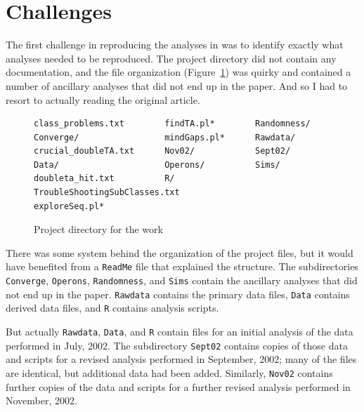 \section{Challenges}

The first challenge in reproducing the analyses
in \citet{lamichhane2003} was to identify exactly what analyses needed
to be reproduced. The project directory did not contain any
documentation, and the file organization (Figure~\ref{fig:files}) was
quirky and contained a number of ancillary analyses that did not end
up in the paper. And so I had to resort to actually reading the
original article.



\begin{figure}

\begin{lstlisting}
class_problems.txt        findTA.pl*        Randomness/
Converge/                 mindGaps.pl*      Rawdata/
crucial_doubleTA.txt      Nov02/            Sept02/
Data/                     Operons/          Sims/
doubleta_hit.txt          R/                TroubleShootingSubClasses.txt
exploreSeq.pl*
\end{lstlisting}

\caption{Project directory for the work\label{fig:files}}
\end{figure}



There was some system behind the organization of the project files,
but it would have benefited from a {\tt ReadMe} file that
explained the structure. The
subdirectories {\tt Converge}, {\tt Operons}, {\tt Randomness},
and {\tt Sims} contain the ancillary analyses that did not end up in the
paper. {\tt Rawdata} contains the primary data files, {\tt Data}
contains derived data files, and {\tt R} contains analysis scripts.

But actually {\tt Rawdata}, {\tt Data}, and {\tt R} contain files
for an initial analysis of the data performed in July, 2002. The subdirectory
{\tt Sept02} contains copies of those data and scripts
for a revised analysis performed in September, 2002; many of the files
are identical, but additional data had been added.
Similarly, {\tt Nov02} contains further copies of the data and
scripts for a further revised analysis performed in November, 2002.

